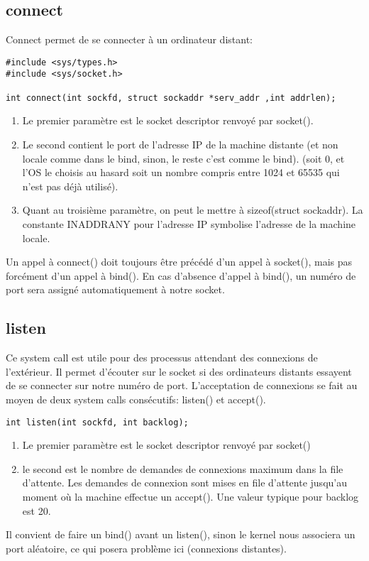 \documentclass[a4paper]{article}
\begin{document}
\subsection{connect}
Connect permet de se connecter à un ordinateur distant:
\begin{lstlisting}
#include <sys/types.h>
#include <sys/socket.h>

int connect(int sockfd, struct sockaddr *serv_addr ,int addrlen);
\end{lstlisting}
\begin{enumerate}
  \item Le premier paramètre est le socket descriptor renvoyé par socket().
  \item Le second contient le port de l'adresse IP de la machine distante (et non locale comme dans le bind, sinon, le reste c'est comme le bind). (soit 0, et l'OS le choisis au hasard soit un nombre compris entre 1024 et 65535 qui n'est pas déjà utilisé).
  \item Quant au troisième paramètre, on peut le mettre à sizeof(struct sockaddr). La constante INADDR\textunderscore{}ANY pour l'adresse IP symbolise l'adresse de la machine locale.
\end{enumerate}
Un appel à connect() doit toujours être précédé d'un appel à socket(), mais pas forcément d'un appel à bind(). En cas d'absence d'appel à bind(), un numéro de port sera assigné automatiquement à notre socket.
\subsection{listen}
Ce system call est utile pour des processus attendant des connexions de l'extérieur. Il permet d'écouter sur le socket si des ordinateurs distants essayent de se connecter sur notre numéro de port. L'acceptation de connexions se fait au moyen de deux system calls consécutifs: listen() et accept().
\begin{lstlisting}
int listen(int sockfd, int backlog);
\end{lstlisting}
\begin{enumerate}
  \item Le premier paramètre est le socket descriptor renvoyé par socket()
  \item le second est le nombre de demandes de connexions maximum dans la file d'attente. Les demandes de connexion sont mises en file d'attente jusqu'au moment où la machine effectue un accept(). Une valeur typique pour backlog est 20.
\end{enumerate}
Il convient de faire un bind() avant un listen(), sinon le kernel nous associera un port aléatoire, ce qui posera problème ici (connexions distantes).
\end{document}
